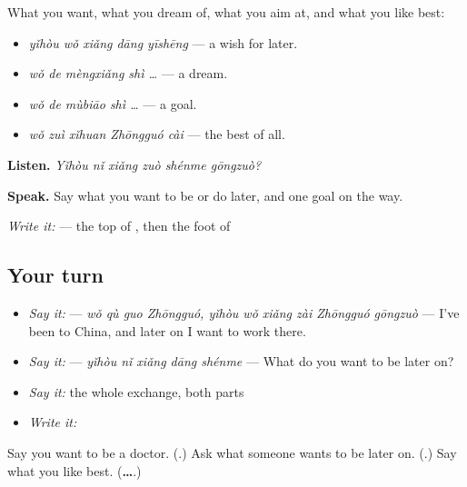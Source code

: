\begin{grammarlens}[title={What you've built — looking ahead}]
What you want, what you dream of, what you aim at, and what you like best:

\begin{itemize}
\raggedright
  \item \textbf{} \emph{yǐhòu wǒ xiǎng dāng yīshēng} — a wish for later.
  \item \emph{wǒ de mèngxiǎng shì …} — a dream.
  \item \emph{wǒ de mùbiāo shì …} — a goal.
  \item \textbf{} \emph{wǒ zuì xǐhuan Zhōngguó cài} — the best of all.
\end{itemize}

\textbf{Listen.} \emph{Yǐhòu nǐ xiǎng zuò shénme gōngzuò?}

\textbf{Speak.} Say what you want to be or do later, and one goal on the way.

\emph{Write it:}  — the top of , then the foot of 
\end{grammarlens}

\subsection*{Your turn}
\begin{itemize}
\raggedright
  \item \emph{Say it:}   — \emph{wǒ qù guo Zhōngguó, yǐhòu wǒ xiǎng zài Zhōngguó gōngzuò} — I've been to China, and later on I want to work there.
  \item \emph{Say it:}  — \emph{yǐhòu nǐ xiǎng dāng shénme} — What do you want to be later on?
  \item \emph{Say it:} the whole exchange, both parts
  \item \emph{Write it:} 
\end{itemize}

\begin{tcolorbox}[breakable,colback=teal!4,colframe=teal!35!black,title={Before you move on}]
Say you want to be a doctor. (\textbf{}.) Ask what someone wants to be later on. (\textbf{}.) Say what you like best. (\textbf{…}.)
\end{tcolorbox}
